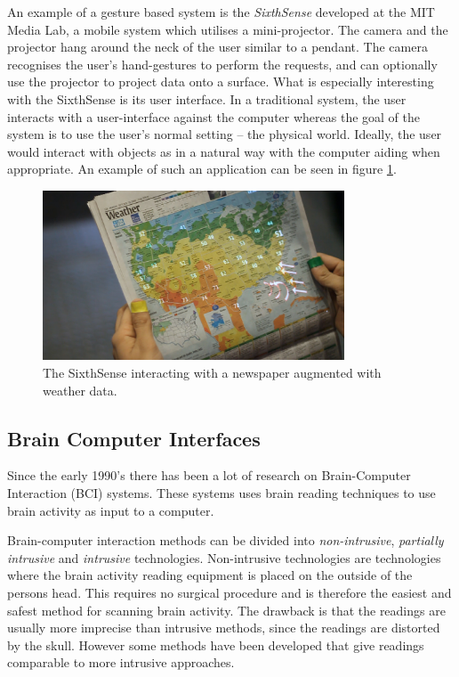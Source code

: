 An example of a gesture based system is the \emph{SixthSense} developed at the MIT Media Lab, a mobile system which utilises a mini-projector. The camera and the projector hang around the neck of the user similar to a pendant. The camera recognises the user's hand-gestures to perform the requests, and can optionally use the projector to project data onto a surface. What is especially interesting with the SixthSense is its user interface. In a traditional system, the user interacts with a user-interface against the computer whereas the goal of the system is to use the user's normal setting -- the physical world\cite{Mistry:2009:SWG:1667146.1667160}. Ideally, the user would interact with objects as in a natural way with the computer aiding when appropriate. An example of such an application can be seen in figure \ref{sixthsense}.


\begin{figure}[]
\includegraphics[width=0.8\textwidth] {bilder/newspaper.jpg}
\caption{The SixthSense interacting with a newspaper augmented with weather data.}
\label{sixthsense}
\end{figure}
\nocite{newspaper}


\subsection{Brain Computer Interfaces}

Since the early 1990's there has been a lot of research on Brain-Computer Interaction (BCI) systems\cite{lebedev2006brain}. These systems uses brain reading techniques to use brain activity as input to a computer.

Brain-computer interaction methods can be divided into \emph{non-intrusive}, \emph{partially intrusive} and \emph{intrusive} technologies\cite{legobrain}. Non-intrusive technologies are technologies where the brain activity reading equipment is placed on the outside of the persons head. This requires no surgical procedure and is therefore the easiest and safest method for scanning brain activity. The drawback is that the readings are usually more imprecise than intrusive methods, since the readings are distorted by the skull. However some methods\cite{doud2011continuous} have been developed that give readings comparable to more intrusive approaches.

